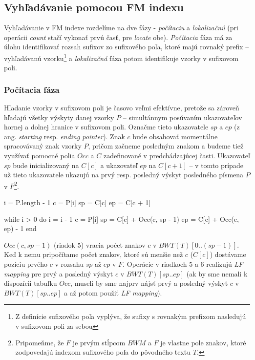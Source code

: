     \subsection{Vyhľadávanie pomocou FM indexu}
    Vyhľadávanie v FM indexe rozdelíme na dve fázy - \emph{počítaciu} a \emph{lokalizačnú} (pri operácii \emph{count} stačí vykonať prvú časť, pre \emph{locate} obe). \emph{Počítacia} fáza má za úlohu identifikovať rozsah sufixov zo sufixového poľa, ktoré majú rovnaký prefix -- vyhľadávanú vzorku\footnote{Z definície sufixového poľa vyplýva, že sufixy s rovnakým prefixom nasledujú v sufixovom poli za sebou} a \emph{lokalizačná} fáza potom identifikuje vzorky v sufixovom poli.
    
    \subsubsection{Počítacia fáza}
    Hľadanie vzorky v sufixovom poli je časovo veľmi efektívne, pretože sa zároveň hľadajú všetky výskyty danej vzorky $P$ -- simultánnym posúvaním ukazovateľov hornej a dolnej hranice v sufixovom poli. Označme tieto ukazovatele $sp$ a $ep$ (z ang. \emph{starting} resp. \emph{ending pointer}). Znak $c$ bude obsahovať momentálne spracovávaný znak vzorky $P$, pričom začneme posledným znakom a budeme tiež využívať pomocné polia $Occ$ a $C$ zadefinované v predchádzajúcej časti. Ukazovateľ $sp$ bude inicializovaný na $C[c]$ a ukazovateľ $ep$ na $C[c + 1]$ -- v tomto prípade už tieto ukazovatele ukazujú na prvý resp. posledný výskyt posledného písmena $P$ v $F$\footnote{Pripomeňme, že $F$ je prvým stĺpcom $BWM$ a $F$ je vlastne pole znakov, ktoré zodpovedajú indexom sufixového poľa do pôvodného textu $T$.}.
    
    \bigskip
    
    \begin{pseudocode}[label=lst:fm_search_algorithm,caption={Algoritmus na hľadanie vzorky pomocou FM indexu}]
i = P.length - 1
c = P[i]
sp = C[c]
ep = C[c + 1]

while i > 0 do
  i = i - 1
  c = P[i]
  sp = C[c] + Occ(c, sp - 1)
  ep = C[c] + Occ(c, ep) - 1
end
    \end{pseudocode}
    
    $Occ(c, sp - 1)$ (riadok 5) vracia počet znakov $c$ v $BWT(T)[0..(sp - 1)]$. Keď k nemu pripočítame počet znakov, ktoré sú menšie než $c$ ($C[c]$) dostávame pozíciu prvého $c$ v rozsahu $sp$ až $ep$ v $F$. Operácie v riadkoch 5 a 6 realizujú \emph{LF mapping} pre prvý a posledný výskyt $c$ v $BWT(T)[sp..ep]$ (ak by sme nemali k dispozícii tabuľku $Occ$, museli by sme najprv nájsť prvý a posledný výskyt $c$ v $BWT(T)[sp..ep]$ a až potom použiť \emph{LF mapping}).
    
